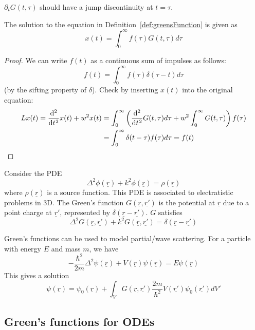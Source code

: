 \begin{remark}
	$\partial_t G(t, \tau)$ should have a jump discontinuity at $t = \tau$.
\end{remark}

\begin{proposition}
	The solution to the equation in Definition~\ref{def:greensFunction} is given as
	\[
		x(t) = \int_{0}^{\infty} f(\tau) G(t, \tau) d\tau
	\]
\end{proposition}

\begin{proof}
	We can write $f(t)$ as a continuous sum of impulses as follows:
	\[
		f(t) = \int_{0}^{\infty} f(\tau) \delta(\tau - t) d\tau
	\]
	(by the sifting property of $\delta$). Check by inserting $x(t)$ into the original equation:
	\[
		\begin{aligned}
			L x(t) = \diff[2]{}{t} x(t) + w^2 x(t) & = \int_{0}^{\infty} \left( \diff[2]{}{t} G(t, \tau) d\tau + w^2 \int_{0}^{\infty} G(t, \tau) \right) f(\tau) \\
			& = \int_{0}^{\infty} \delta(t - \tau) f(\tau) d\tau = f(t)
		\end{aligned}
	\] 
\end{proof}

\begin{example}
	Consider the PDE
	\[
		\Delta^2 \phi(\underline{r}) + k^2 \phi(\underline{r}) = \rho(\underline{r})
	\]
	where $\rho(\underline{r})$ is a source function. This PDE is associated to electratistic problems in 3D. The Green's function $G(\underline{r}, \underline{r'})$ is the potential at $\underline{r}$ due to a point charge at $\underline{r}'$, represented by $\delta(\underline{r} - \underline{r'})$. $G$ satisfies
	\[
		\Delta^2 G(\underline{r}, \underline{r'}) + k^2 G(\underline{r}, \underline{r'}) = \delta(\underline{r} - \underline{r'})
	\]
\end{example}

\begin{example}
	Green's functions can be used to model partial/wave scattering. For a particle with energy $E$ and mass $m$, we have
	\[
		-\frac{\hbar^2}{2m} \Delta^2 \psi(\underline{r}) + V(\underline{r}) \psi(\underline{r}) = E \psi(\underline{r})
	\]
	This gives a solution
	\[
		\psi(\underline{r}) = \psi_0(\underline{r}) + \int_V G(\underline{r}, \underline{r'}) \frac{2m}{\hbar^2} V(\underline{r'}) \psi_0(\underline{r'}) d V'
	\]
\end{example}

\subsection{Green's functions for ODEs}

